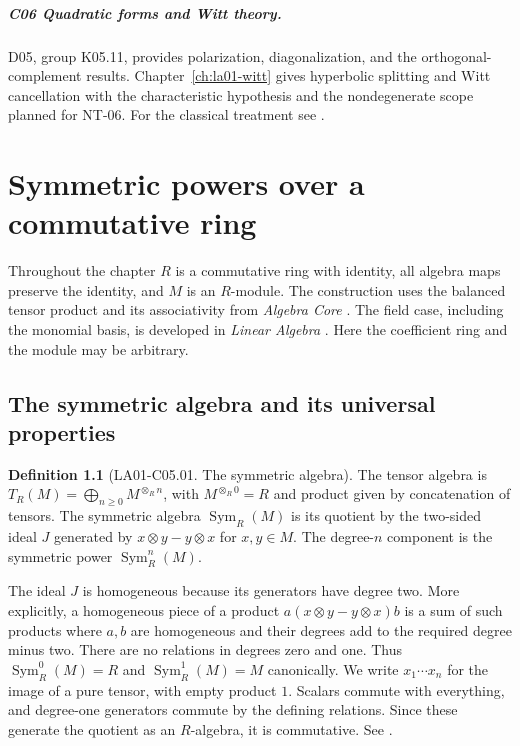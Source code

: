 \documentclass[11pt,oneside,openany]{book}
\theoremstyle{definition}
\newtheorem{definition}[theorem]{Definition}
\theoremstyle{remark}
\begin{document}
\paragraph{C06 \enspace Quadratic forms and Witt theory.}
D05, group K05.11, provides polarization, diagonalization, and the
orthogonal-complement results. Chapter~\ref{ch:la01-witt} gives
hyperbolic splitting and Witt cancellation with the characteristic
hypothesis and the nondegenerate scope planned for NT-06.
For the classical treatment see \cite[Ch.~I, Sec.~4]{lam-witt}.

\mainmatter
\chapter{Symmetric powers over a commutative ring}\label{ch:la01-symmetric}

Throughout the chapter \(R\) is a commutative ring with identity, all
algebra maps preserve the identity, and \(M\) is an \(R\)-module.
The construction uses the balanced tensor product and its
associativity from \emph{Algebra Core}
\cite[ALG-03-C02-S01]{p103}. The field case, including the monomial
basis, is developed in \emph{Linear Algebra}
\cite[entries 15.symmetric and 15.symmetric\_basis]{d05}. Here the
coefficient ring and the module may be arbitrary.

\section{The symmetric algebra and its universal properties}

\begin{definition}[LA01-C05.01. The symmetric algebra]
\label{def:la01-symmetric-algebra}
The tensor algebra is \(T_R(M)=\bigoplus_{n\ge 0}M^{\otimes_R n}\),
with \(M^{\otimes_R 0}=R\) and product given by concatenation of
tensors. The symmetric algebra \(\operatorname{Sym}_R(M)\) is its
quotient by the two-sided ideal \(J\) generated by
\(x\otimes y-y\otimes x\) for \(x,y\in M\). The degree-\(n\) component
is the symmetric power \(\operatorname{Sym}^n_R(M)\).
\end{definition}

The ideal \(J\) is homogeneous because its generators have degree
two. More explicitly, a homogeneous piece of a product
\(a(x\otimes y-y\otimes x)b\) is a sum of such products where \(a,b\)
are homogeneous and their degrees add to the required degree minus
two. There are no relations in degrees zero and one. Thus
\(\operatorname{Sym}^0_R(M)=R\) and
\(\operatorname{Sym}^1_R(M)=M\) canonically. We write \(x_1\cdots x_n\)
for the image of a pure tensor, with empty product \(1\). Scalars
commute with everything, and degree-one generators commute by the
defining relations. Since these generate the quotient as an
\(R\)-algebra, it is commutative. See \cite[Algebra, Section 10.13]{stacks-sym}.
\end{document}
